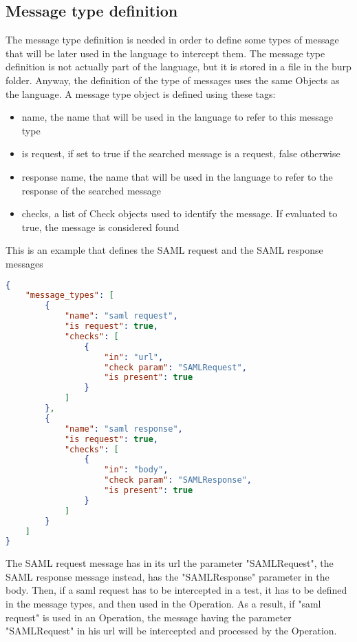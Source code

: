 \subsection{Message type definition}
The message type definition is needed in order to define some types of message that will be later used in the language to intercept them.
The message type definition is not actually part of the language, but it is stored in a file in the burp folder. Anyway, the definition of the type of messages uses the same Objects as the language.
A message type object is defined using these tags:
\begin{itemize}
    \item name, the name that will be used in the language to refer to this message type
    \item is request, if set to true if the searched message is a request, false otherwise
    \item response name, the name that will be used in the language to refer to the response of the searched message
    \item checks, a list of Check objects used to identify the message. If evaluated to true, the message is considered found
\end{itemize}

This is an example that defines the SAML request and the SAML response messages
\begin{lstlisting}[language=json]
{
    "message_types": [
        {
            "name": "saml request",
            "is request": true,
            "checks": [
                {
                    "in": "url",
                    "check param": "SAMLRequest",
                    "is present": true
                }
            ]
        },
        {
            "name": "saml response",
            "is request": true,
            "checks": [
                {
                    "in": "body",
                    "check param": "SAMLResponse",
                    "is present": true
                }
            ]
        }
    ]
}
\end{lstlisting}
The SAML request message has in its url the parameter "SAMLRequest", the SAML response message instead, has the "SAMLResponse" parameter in the body. Then, if a saml request has to be intercepted in a test, it has to be defined in the message types, and then used in the Operation.
As a result, if "saml request" is used in an Operation, the message having the parameter "SAMLRequest" in his url will be intercepted and processed by the Operation.


